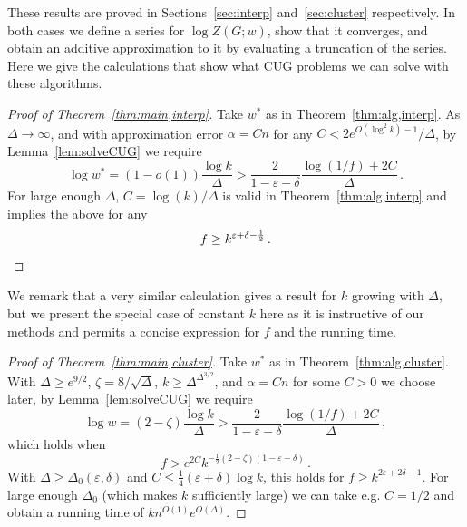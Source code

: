 \documentclass[10pt,a4paper]{article}
\theoremstyle{definition}
\newcommand*{\eps}{\varepsilon}
\begin{document}
%
These results are proved in Sections~\ref{sec:interp} and~\ref{sec:cluster} respectively. 
In both cases we define a series for $\log Z(G;w)$, show that it converges, and obtain an additive approximation to it by evaluating a truncation of the series. 
Here we give the calculations that show what CUG problems we can solve with these algorithms. 
%
\begin{proof}[Proof of Theorem~\ref{thm:main,interp}]
Take $w^*$ as in Theorem~\ref{thm:alg,interp}.
As $\Delta\to\infty$, and with approximation error $\alpha=Cn$ for any $C<2e^{O(\log^2k)-1}/\Delta$, by Lemma~\ref{lem:solveCUG} we require 
\[
\log w^* = (1-o(1))\frac{\log k}{\Delta} > \frac{2}{1-\eps-\delta}\frac{\log(1/f)+2C}{\Delta}\,.
\]
For large enough $\Delta$, $C=\log(k)/\Delta$ is valid in Theorem~\ref{thm:alg,interp} and implies the above for any
\[
f \ge k^{\eps+\delta-\frac{1}{2}}\,.\qedhere
\]
\end{proof}
We remark that a very similar calculation gives a result for $k$ growing with $\Delta$, but we present the special case of constant $k$ here as it is instructive of our methods and permits a concise expression for $f$ and the running time.
%
\begin{proof}[Proof of Theorem~\ref{thm:main,cluster}]
Take $w^*$ as in Theorem~\ref{thm:alg,cluster}. 
With $\Delta\ge e^{9/2}$, $\zeta=8/\sqrt\Delta$, $k\ge \Delta^{\Delta^{3/2}}$, and $\alpha=Cn$ for some $C>0$ we choose later, by Lemma~\ref{lem:solveCUG} we require 
\[
\log w = (2-\zeta)\frac{\log k}{\Delta} > \frac{2}{1-\eps-\delta}\frac{\log(1/f)+2C}{\Delta}\,,
\]
which holds when
\[
f > e^{2C}k^{-\frac{1}{2}(2-\zeta)(1-\eps-\delta)}\,.
\]
With $\Delta\ge\Delta_0(\eps,\delta)$ and $C \le \frac{1}{4}(\eps+\delta)\log k$, this holds for $f \ge k^{2\eps+2\delta-1}$.
For large enough $\Delta_0$ (which makes $k$ sufficiently large) we can take e.g. $C=1/2$ and obtain a running time of $kn^{O(1)}e^{O(\Delta)}$.
\end{proof}
%
%
\end{document}
